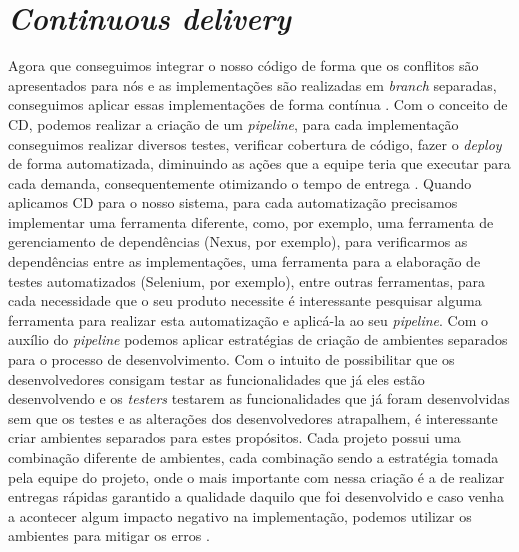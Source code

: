       \section{\textit{Continuous delivery}}
        Agora que conseguimos integrar o nosso código de forma que os conflitos são
        apresentados para nós e as implementações são realizadas em \textit{branch}
        separadas, conseguimos aplicar essas implementações de forma contínua
        \cite{TheDevOpsHandbook}. Com o conceito de CD, podemos realizar a criação
        de um \textit{pipeline}, para cada implementação conseguimos realizar
        diversos testes, verificar cobertura de código, fazer o \textit{deploy}
        de forma automatizada, diminuindo as ações que a equipe teria que executar
        para cada demanda, consequentemente otimizando o tempo de entrega
        \cite{ContinuousDelivery}. Quando aplicamos CD para o nosso sistema,
        para cada automatização precisamos implementar uma ferramenta diferente,
        como, por exemplo, uma ferramenta de gerenciamento de dependências
        (Nexus, por exemplo), para verificarmos as dependências entre as implementações,
        uma ferramenta para a elaboração de testes automatizados (Selenium, por exemplo),
        entre outras ferramentas, para cada necessidade que o seu produto necessite
        é interessante pesquisar alguma ferramenta para realizar esta automatização
        e aplicá-la ao seu \textit{pipeline}. \newline
        Com o auxílio do \textit{pipeline} podemos aplicar estratégias de criação
        de ambientes separados para o processo de desenvolvimento. Com o intuito de
        possibilitar que os desenvolvedores consigam testar as funcionalidades que
        já eles estão desenvolvendo e os \textit{testers} testarem as funcionalidades
        que já foram desenvolvidas sem que os testes e as alterações dos desenvolvedores
        atrapalhem, é interessante criar ambientes separados para estes propósitos.
        Cada projeto possui uma combinação diferente de ambientes, cada combinação
        sendo a estratégia tomada pela equipe do projeto, onde o mais importante com
        nessa criação é a de realizar entregas rápidas garantido a qualidade daquilo
        que foi desenvolvido e caso venha a acontecer algum impacto negativo na
        implementação, podemos utilizar os ambientes para mitigar os erros
        \cite{TheDevOpsHandbook}. \newline

